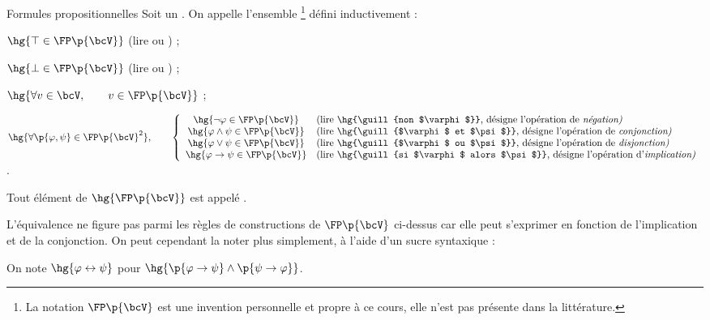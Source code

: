     \begin{definition}{Formules propositionnelles}{}
        Soit \hg{$\bcV$} un . On appelle  l'ensemble \hg{$\FP\p{\bcV}$}\footnote{La notation $\FP\p{\bcV}$ est une invention personnelle et propre à ce cours, elle n'est pas présente dans la littérature.} défini inductivement :
        \begin{enumerate}
            \itast $\hg{\top \in \FP\p{\bcV}}$ (lire  ou ) ;
            
            \itast $\hg{\bot \in \FP\p{\bcV}}$ (lire  ou ) ;
            
            \itast $\hg{\forall v \in \bcV,\qquad v \in \FP\p{\bcV}}$ ;
            
            \itast $\hg{\forall \p{\varphi, \psi} \in \FP\p{\bcV}^2},\qquad \left\lbrace\begin{array}{cl}
                \hg{\neg \varphi \in \FP\p{\bcV}} &\text{(lire \hg{\guill{non $\varphi$}}, désigne l'opération de \itshape négation)} \\
                \hg{\varphi \land \psi \in \FP\p{\bcV}} &\text{(lire \hg{\guill{$\varphi$ et $\psi$}}, désigne l'opération de \itshape conjonction)} \\
                \hg{\varphi \lor \psi \in \FP\p{\bcV}} &\text{(lire \hg{\guill{$\varphi$ ou $\psi$}}, désigne l'opération de \itshape disjonction)} \\
                \hg{\varphi \rightarrow \psi \in \FP\p{\bcV}} &\text{(lire \hg{\guill{si $\varphi$ alors $\psi$}}, désigne l'opération d'\itshape implication)}
            \end{array}\right.$.
        \end{enumerate}
        Tout élément de $\hg{\FP\p{\bcV}}$ est appelé .
    \end{definition}
    
    
    L'équivalence ne figure pas parmi les règles de constructions de $\FP\p{\bcV}$ ci-dessus car elle peut s'exprimer en fonction de l'implication et de la conjonction. On peut cependant la noter plus simplement, à l'aide d'un sucre syntaxique :
    
    \begin{notation}
        On note $\hg{\varphi \leftrightarrow \psi}$ pour $\hg{\p{\varphi \rightarrow \psi} \land \p{\psi \rightarrow \varphi}}$.
    \end{notation}
    
